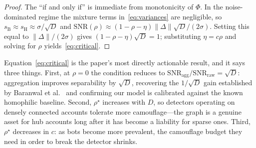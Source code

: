 \documentclass[onecolumn,pdflatex,sn-basic,Numbered]{sn-jnl}
\theoremstyle{thmstyleone}
\theoremstyle{thmstylethree}
\begin{document}
\begin{proof}
The ``if and only if'' is immediate from monotonicity of $\Phi$. In the
noise-dominated regime the mixture terms in~\eqref{eq:variances} are negligible, so
$s_{\mathrm{B}} \approx s_{\mathrm{H}} \approx \sigma/\sqrt{D}$ and
$\mathrm{SNR}(\rho) \approx (1-\rho-\eta)\|\Delta\|\sqrt{D}/(2\sigma)$. Setting this
equal to $\|\Delta\|/(2\sigma)$ gives $(1-\rho-\eta)\sqrt{D} = 1$; substituting
$\eta = c\rho$ and solving for $\rho$ yields~\eqref{eq:critical}.
\end{proof}

Equation~\eqref{eq:critical} is the paper's most directly actionable result, and it
says three things. First, at $\rho = 0$ the condition reduces to
$\mathrm{SNR}_{\mathrm{agg}}/\mathrm{SNR}_{\mathrm{raw}} = \sqrt{D}$: aggregation
improves separability by $\sqrt{D}$, recovering the $1/\sqrt{D}$ gain established
by Baranwal et al.~\citep{baranwal2021graph} and confirming our model is calibrated
against the known homophilic baseline. Second, $\rho^\star$ increases with $D$, so
detectors operating on densely connected accounts tolerate more camouflage---the
graph is a genuine asset for hub accounts long after it has become a liability for
sparse ones. Third, $\rho^\star$ decreases in $c$: as bots become more prevalent,
the camouflage budget they need in order to break the detector shrinks.
\end{document}
